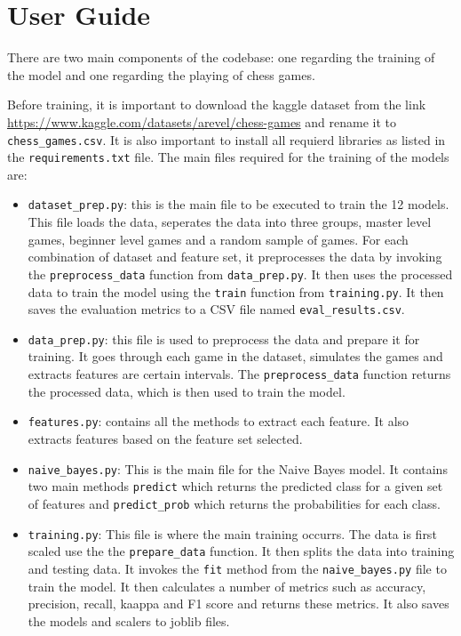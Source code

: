 \chapter{User Guide}

There are two main components of the codebase: one regarding the training of the model and one regarding the playing of chess games.

Before training, it is important to download the kaggle dataset from the link \url{https://www.kaggle.com/datasets/arevel/chess-games} and rename it to \texttt{chess\_games.csv}. It is also important to install all requierd libraries as listed in the \texttt{requirements.txt} file. The main files required for the training of the models are:

\begin{itemize}
    \item \texttt{dataset\_prep.py}: this is the main file to be executed to train the 12 models. This file loads the data, seperates the data into three groups, master level games, beginner level games and a random sample of games. For each combination of dataset and feature set, it preprocesses the data by invoking the \texttt{preprocess\_data} function from \texttt{data\_prep.py}. It then uses the processed data to train the model using the \texttt{train} function from \texttt{training.py}. It then saves the evaluation metrics to a CSV file named \texttt{eval\_results.csv}.
    \item \texttt{data\_prep.py}: this file is used to preprocess the data and prepare it for training. It goes through each game in the dataset, simulates the games and extracts features are certain intervals. The \texttt{preprocess\_data} function returns the processed data, which is then used to train the model.
    \item \texttt{features.py}: contains all the methods to extract each feature. It also extracts features based on the feature set selected.
    \item \texttt{naive\_bayes.py}: This is the main file for the Naive Bayes model. It contains two main methods \texttt{predict} which returns the predicted class for a given set of features and \texttt{predict\_prob} which returns the probabilities for each class. 
    \item \texttt{training.py}: This file is where the main training occurrs. The data is first scaled use the the \texttt{prepare\_data} function. It then splits the data into training and testing data. It invokes the \texttt{fit} method from the \texttt{naive\_bayes.py} file to train the model. It then calculates a number of metrics such as accuracy, precision, recall, kaappa and F1 score and returns these metrics. It also saves the models and scalers to joblib files.
\end{itemize}


